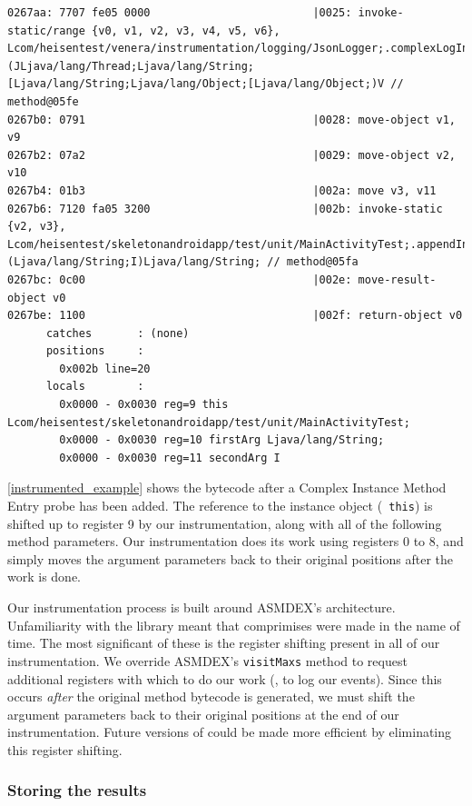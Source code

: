 \begin{lstlisting}[label=instrumented_example]
0267aa: 7707 fe05 0000                         |0025: invoke-static/range {v0, v1, v2, v3, v4, v5, v6}, Lcom/heisentest/venera/instrumentation/logging/JsonLogger;.complexLogInstanceMethodEntry:(JLjava/lang/Thread;Ljava/lang/String;[Ljava/lang/String;Ljava/lang/Object;[Ljava/lang/Object;)V // method@05fe
0267b0: 0791                                   |0028: move-object v1, v9
0267b2: 07a2                                   |0029: move-object v2, v10
0267b4: 01b3                                   |002a: move v3, v11
0267b6: 7120 fa05 3200                         |002b: invoke-static {v2, v3}, Lcom/heisentest/skeletonandroidapp/test/unit/MainActivityTest;.appendIntToString:(Ljava/lang/String;I)Ljava/lang/String; // method@05fa
0267bc: 0c00                                   |002e: move-result-object v0
0267be: 1100                                   |002f: return-object v0
      catches       : (none)
      positions     : 
        0x002b line=20
      locals        : 
        0x0000 - 0x0030 reg=9 this Lcom/heisentest/skeletonandroidapp/test/unit/MainActivityTest; 
        0x0000 - 0x0030 reg=10 firstArg Ljava/lang/String; 
        0x0000 - 0x0030 reg=11 secondArg I 
\end{lstlisting}

\autoref{instrumented_example} shows the bytecode after a Complex Instance
Method Entry probe has been added. The reference to the instance object ({\tt
this}) is shifted up to register 9 by our instrumentation, along with all of the
following method parameters. Our instrumentation does its work using registers 0
to 8, and simply moves the argument parameters back to their original positions
after the work is done.

Our instrumentation process is built around ASMDEX's architecture. Unfamiliarity
with the library meant that comprimises were made in the name of time. The most
significant of these is the register shifting present in all of our
instrumentation. We override ASMDEX's {\tt visitMaxs} method to request
additional registers with which to do our work (\ie, to log our events). Since
this occurs \textit{after} the original method bytecode is generated, we must
shift the argument parameters back to their original positions at the end of our
instrumentation. Future versions of \venera could be made more efficient by
eliminating this register shifting.

\subsubsection{Storing the results}

